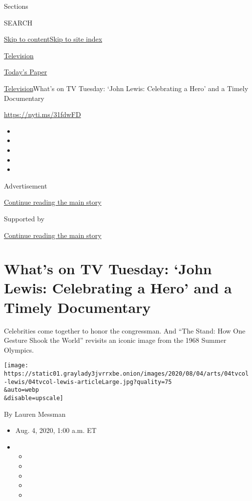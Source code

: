 Sections

SEARCH

\protect\hyperlink{site-content}{Skip to
content}\protect\hyperlink{site-index}{Skip to site index}

\href{https://www.nytimes3xbfgragh.onion/section/arts/television}{Television}

\href{https://myaccount.nytimes3xbfgragh.onion/auth/login?response_type=cookie\&client_id=vi}{}

\href{https://www.nytimes3xbfgragh.onion/section/todayspaper}{Today's
Paper}

\href{/section/arts/television}{Television}\textbar{}What's on TV
Tuesday: `John Lewis: Celebrating a Hero' and a Timely Documentary

\url{https://nyti.ms/31fdwFD}

\begin{itemize}
\item
\item
\item
\item
\item
\end{itemize}

Advertisement

\protect\hyperlink{after-top}{Continue reading the main story}

Supported by

\protect\hyperlink{after-sponsor}{Continue reading the main story}

\hypertarget{whats-on-tv-tuesday-john-lewis-celebrating-a-hero-and-a-timely-documentary}{%
\section{What's on TV Tuesday: `John Lewis: Celebrating a Hero' and a
Timely
Documentary}\label{whats-on-tv-tuesday-john-lewis-celebrating-a-hero-and-a-timely-documentary}}

Celebrities come together to honor the congressman. And ``The Stand: How
One Gesture Shook the World'' revisits an iconic image from the 1968
Summer Olympics.

\texttt{[image: https://static01.graylady3jvrrxbe.onion/images/2020/08/04/arts/04tvcol-lewis/04tvcol-lewis-articleLarge.jpg?quality=75\\\&auto=webp\\\&disable=upscale]}

By Lauren Messman

\begin{itemize}
\item
  Aug. 4, 2020, 1:00 a.m. ET
\item
  \begin{itemize}
  \item
  \item
  \item
  \item
  \item
  \end{itemize}
\end{itemize}

